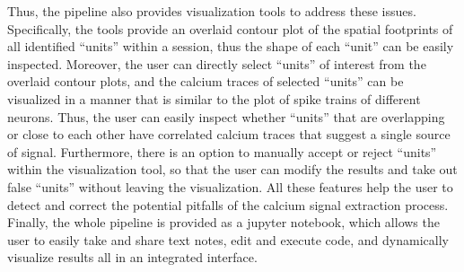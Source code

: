 \documentclass[master.tex]{subfiles}
\begin{document}
Thus, the pipeline also provides visualization tools to address these issues.
Specifically, the tools provide an overlaid contour plot of the spatial
footprints of all identified ``units'' within a session, thus the shape of each
``unit'' can be easily inspected. Moreover, the user can directly select
``units'' of interest from the overlaid contour plots, and the calcium traces of
selected ``units'' can be visualized in a manner that is similar to the plot of
spike trains of different neurons. Thus, the user can easily inspect whether
``units'' that are overlapping or close to each other have correlated calcium
traces that suggest a single source of signal. Furthermore, there is an option
to manually accept or reject ``units'' within the visualization tool, so that
the user can modify the results and take out false ``units'' without leaving the
visualization. All these features help the user to detect and correct the
potential pitfalls of the calcium signal extraction process. Finally, the whole
pipeline is provided as a jupyter notebook, which allows the user to easily take
and share text notes, edit and execute code, and dynamically visualize results
all in an integrated interface.
\end{document}
